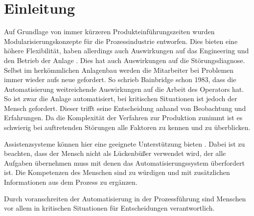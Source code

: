 
\chapter{Einleitung}
\label{sec:Einleitung}

Auf Grundlage von immer kürzeren Produkteinführungszeiten wurden Modularisierungskonzepte für die Prozessindustrie entworfen. Dies bieten eine höhere Flexibilität, haben allerdings auch Auswirkungen auf das Engineering und den Betrieb der Anlage \cite{Obst2013}. Dies hat auch Auswirkungen auf die Störungsdiagnose. Selbst im herkömmlichen Anlagenbau werden die Mitarbeiter bei Problemen immer wieder aufs neue gefordert. So schrieb Bainbridge \cite{Bainbridge1983} schon 1983, dass die Automatisierung weitreichende Auswirkungen auf die Arbeit des Operators hat. So ist zwar die Anlage automatisiert, bei kritischen Situationen ist jedoch der Mensch gefordert. Dieser trifft seine Entscheidung anhand von Beobachtung und Erfahrungen. Da die Komplexität der Verfahren zur Produktion zunimmt ist es schwierig bei auftretenden Störungen alle Faktoren zu kennen und zu überblicken.

Assistenzsysteme können hier eine geeignete Unterstützung bieten \cite{Dalgleish2007} . Dabei ist zu beachten, dass der Mensch nicht als Lückenbüßer verwendet wird, der alle Aufgaben übernehmen muss mit denen das Automatisierungssystem überfordert ist. Die Kompetenzen des Menschen sind zu würdigen und mit zusätzlichen Informationen aus dem Prozess zu ergänzen. \cite{Weisner2018}




Durch voranschreiten der Automatisierung in der Prozessführung sind Menschen vor allem in kritischen Situationen für Entscheidungen verantwortlich.
